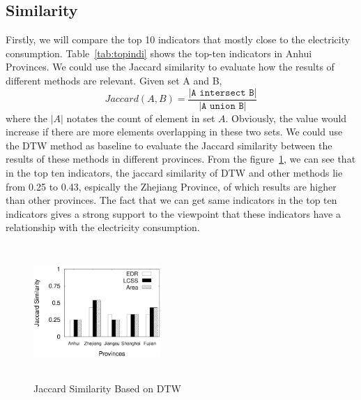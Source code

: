 \subsection{Similarity}
Firstly, we will compare the top 10 indicators that mostly close to the electricity consumption. Table~\ref{tab:topindi} shows the top-ten indicators in Anhui Provinces. We could use the Jaccard similarity to evaluate how the results of different methods are relevant. Given set A and B, 
\begin{equation}
	Jaccard(A, B) = \frac{\texttt{|A intersect B|}}{\texttt{|A union B|}}
\end{equation} 
where the $|A|$ notates the count of element in set $A$. Obviously, the value would increase if there are more elements overlapping in these two sets. We could use the DTW method as baseline to evaluate the Jaccard similarity between the results of these methods in different provinces. From the figure~\ref{fig:Jaccard}, we can see that in the top ten indicators, the jaccard similarity of DTW and other methods lie from 0.25 to 0.43, espically the Zhejiang Province, of which results are higher than other provinces. The fact that we can get same indicators in the top ten indicators gives a strong support to the viewpoint that these indicators have a relationship with the electricity consumption.
\begin{figure}
	\centering
	\includegraphics[height=2in, width=1.9in]{dtw_jaccard_similarity}
	\caption{Jaccard Similarity Based on DTW}
	\label{fig:Jaccard}
\end{figure}

